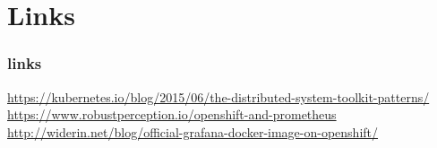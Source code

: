 
\section{Links}

\begin{frame}
  \frametitle{links}
  \url{https://kubernetes.io/blog/2015/06/the-distributed-system-toolkit-patterns/}
  \url{https://www.robustperception.io/openshift-and-prometheus}
  \url{http://widerin.net/blog/official-grafana-docker-image-on-openshift/}
\end{frame}